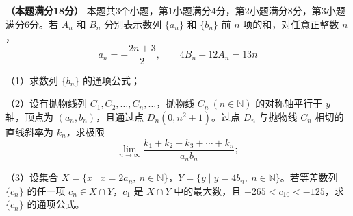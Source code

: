 \begin{question}
\textbf{（本题满分18分）} 本题共3个小题，第1小题满分4分，第2小题满分8分，第3小题满分6分。若 $A_n$ 和 $B_n$ 分别表示数列 $\{a_n\}$ 和 $\{b_n\}$ 前 $n$ 项的和，对任意正整数 $n$，
\nopagebreak[4]
\[
a_n=-\frac{2n+3}{2},\qquad 4B_n-12A_n=13n
\]

（1）求数列 $\{b_n\}$ 的通项公式；

（2）设有抛物线列 $C_1,C_2,\ldots,C_n,\ldots$，抛物线 $C_n\ (n\in\mathbb N)$ 的对称轴平行于 $y$ 轴，顶点为 $(a_n,b_n)$，且通过点 $D_n(0,n^2+1)$。过点 $D_n$ 与抛物线 $C_n$ 相切的直线斜率为 $k_n$，求极限
\nopagebreak[4]
\[
\lim_{n\to\infty}\frac{k_1+k_2+k_3+\cdots+k_n}{a_nb_n};
\]

（3）设集合 $X=\{x\mid x=2a_n,\ n\in\mathbb N\}$，$Y=\{y\mid y=4b_n,\ n\in\mathbb N\}$。若等差数列 $\{c_n\}$ 的任一项 $c_n\in X\cap Y$，$c_1$ 是 $X\cap Y$ 中的最大数，且 $-265<c_{10}<-125$，求 $\{c_n\}$ 的通项公式。

\end{question}